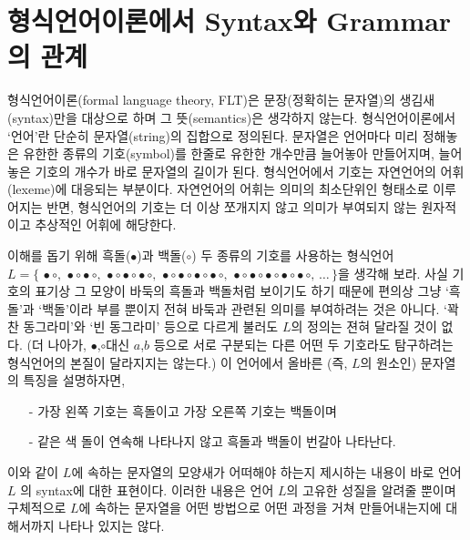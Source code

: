 \documentclass[b5paper,chapter,figtabcapt]{oblivoir}
\providecommand{\tightlist}{%
      \setlength{\itemsep}{0pt}\setlength{\parskip}{0pt}}
\newcommand{\txtbullet}[0]{\ensuremath{\bullet}}
\newcommand{\txtcircle}[0]{\ensuremath{\circ}}
\begin{document}
\section{형식언어이론에서 Syntax와 Grammar의 관계}
\label{sec:FormalLangSG}
형식언어이론(formal language theory, FLT)은 문장(정확히는 문자열)의 생김새(syntax)만을
대상으로 하며 그 뜻(semantics)은 생각하지 않는다. 형식언어이론에서 `언어'란 단순히
문자열(string)의 집합으로 정의된다. 문자열은 언어마다 미리 정해놓은 유한한 종류의
기호(symbol)를 한줄로 유한한 개수만큼 늘어놓아 만들어지며, 늘어놓은 기호의 개수가
바로 문자열의 길이가 된다. 형식언어에서 기호는 자연언어의 어휘(lexeme)에 대응되는 부분이다.
자연언어의 어휘는 의미의 최소단위인 형태소로 이루어지는 반면,
형식언어의 기호는 더 이상 쪼개지지 않고 의미가 부여되지 않는
원자적이고 추상적인 어휘에 해당한다.

이해를 돕기 위해 흑돌(\txtbullet)과 백돌(\txtcircle) 두 종류의 기호를 사용하는 형식언어
$L = \{\, \txtbullet\txtcircle
      ,\, \txtbullet\txtcircle\txtbullet\txtcircle
      ,\, \txtbullet\txtcircle\txtbullet\txtcircle\txtbullet\txtcircle
      ,\, \txtbullet\txtcircle\txtbullet\txtcircle\txtbullet\txtcircle\txtbullet\txtcircle
      ,\, \txtbullet\txtcircle\txtbullet\txtcircle\txtbullet\txtcircle\txtbullet\txtcircle\txtbullet\txtcircle
      ,\, \ldots
   \,\}$을 생각해 보라.
사실 기호의 표기상 그 모양이 바둑의 흑돌과 백돌처럼 보이기도 하기 때문에
편의상 그냥 `흑돌'과 `백돌'이라 부를 뿐이지 전혀 바둑과 관련된 의미를
부여하려는 것은 아니다. `꽉찬 동그라미'와 `빈 동그라미' 등으로 다르게
불러도 $L$의 정의는 젼혀 달라질 것이 없다. (더 나아가,
\txtbullet,\txtcircle 대신 $a$,$b$ 등으로 서로 구분되는
다른 어떤 두 기호라도 탐구하려는 형식언어의 본질이 달라지지는 않는다.)
이 언어에서 올바른 (즉, $L$의 원소인) 문자열의 특징을 설명하자면,\vspace{-1ex}
\begin{itemize}\tightlist
    \item[-] 가장 왼쪽 기호는 흑돌이고 가장 오른쪽 기호는 백돌이며
    \item[-] 같은 색 돌이 연속해 나타나지 않고 흑돌과 백돌이 번갈아 나타난다.
\end{itemize}
이와 같이 $L$에 속하는 문자열의 모양새가 어떠해야 하는지 제시하는 내용이
바로 언어 $L$ 의 syntax에 대한 표현이다. 이러한 내용은 언어 $L$의 고유한
성질을 알려줄 뿐이며 구체적으로 $L$에 속하는 문자열을 어떤 방법으로 어떤
과정을 거쳐 만들어내는지에 대해서까지 나타나 있지는 않다.
\end{document}
